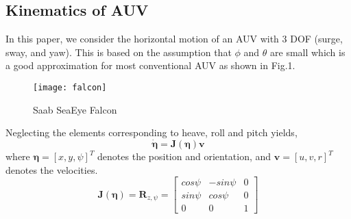 \documentclass[journal,11pt,draftcls,onecolumn]{IEEEtran}
\begin{document}
\subsection{Kinematics of AUV}
In this paper, we consider the horizontal motion of an AUV with 3 DOF (surge, sway, and yaw). This is based on the assumption that $\phi$ and $\theta$ are small which is a good approximation for most conventional AUV as shown in Fig.1. 
\graphicspath{{./Fig/}}
\begin{figure}
\texttt{[image: falcon]}
\centering
\caption{Saab SeaEye Falcon}
\label{fig1}%
\end{figure}
Neglecting the elements corresponding to heave, roll and pitch yields\cite{fossen2002marine},
\begin{equation}
\bm{\dot{\eta}}=\textbf{J}(\bm{\eta})\textbf{v}
\end{equation} 
where $\bm{\eta}=[x,y,\psi]^T$ denotes the position and orientation, and $\textbf{v}=[u,v,r]^T$ denotes the velocities.
\begin{equation}
\textbf{J}(\bm{\eta})=\textbf{R}_{z,\psi}=\begin{bmatrix}cos\psi &-sin\psi &0\\sin\psi &cos\psi &0\\0 &0 &1\end{bmatrix}
\end{equation}
\end{document}

